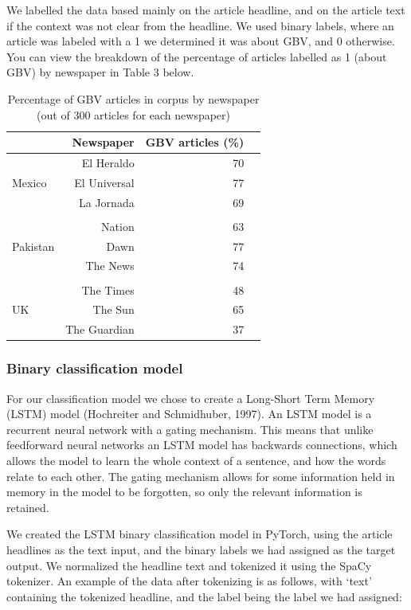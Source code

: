 \documentclass{article}
\begin{document}
{{{We labelled the data based mainly on the article headline, and on the article text if the context was not clear from the headline. We used binary labels, where an article was labeled with a 1 we determined it was about GBV, and 0 otherwise. You can view the breakdown of the percentage of articles labelled as 1 (about GBV) by newspaper in Table 3 below.

\begin{table}[!htp]\centering
	\caption{Percentage of GBV articles in corpus by newspaper (out of 300 articles for each newspaper)}\label{tab: }
	\scriptsize
	\begin{tabular}{lrrr}\toprule
		&\textbf{Newspaper} &\textbf{GBV articles (\%)} \\\midrule
		\multirow{3}{*}{Mexico} &El Heraldo &70 \\
		&El Universal &77 \\
		&La Jornada &69 \\
		& & & \\
		\multirow{3}{*}{Pakistan} &Nation &63 \\
		&Dawn &77 \\
		&The News &74 \\
		& & & \\
		\multirow{3}{*}{UK} &The Times &48 \\
		&The Sun &65 \\
		&The Guardian &37 \\
		\bottomrule
	\end{tabular}
\end{table}

}

\subsubsection{Binary classification model}{

For our classification model we chose to create a Long-Short Term Memory (LSTM) model (Hochreiter and Schmidhuber, 1997). An LSTM model is a recurrent neural network with a gating mechanism. This means that unlike feedforward neural networks an LSTM model has backwards connections, which allows the model to learn the whole context of a sentence, and how the words relate to each other. The gating mechanism allows for some information held in memory in the model to be forgotten, so only the relevant information is retained. 

We created the LSTM binary classification model in PyTorch, using the article headlines as the text input, and the binary labels we had assigned as the target output. We normalized the headline text and tokenized it using the SpaCy tokenizer. An example of the data after tokenizing is as follows, with ‘text’ containing the tokenized headline, and the label being the label we had assigned:

}}}
\end{document}
